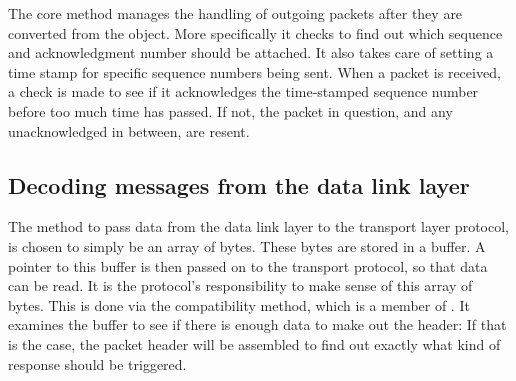 The core method  manages the handling of outgoing packets after they are converted from the  object. More specifically it checks to find out which sequence and acknowledgment number should be attached. It also takes care of setting a time stamp for specific sequence numbers being sent. When a packet is received, a check is made to see if it acknowledges the time-stamped sequence number before too much time has passed. If not, the packet in question, and any unacknowledged in between, are resent.


\subsection{Decoding messages from the data link layer}
The method to pass data from the data link layer to the transport layer protocol, is chosen to simply be an array of bytes. These bytes are stored in a buffer. A pointer to this buffer is then passed on to the transport protocol, so that data can be read. It is the protocol's responsibility to make sense of this array of bytes. This is done via the compatibility  method, which is a member of . It examines the buffer to see if there is enough data to make out the header: If that is the case, the packet header will be assembled to find out exactly what kind of response should be triggered.

